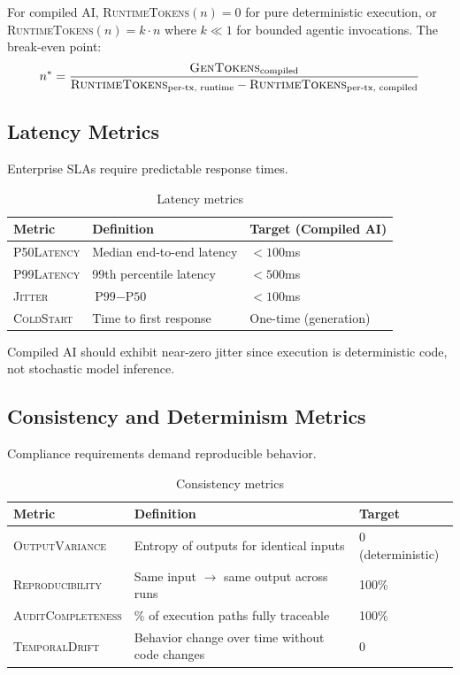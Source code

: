 \documentclass[11pt]{article}
\newcommand{\metric}[1]{\textsc{#1}}
\begin{document}
For compiled AI, \metric{RuntimeTokens}$(n) = 0$ for pure deterministic execution, or \metric{RuntimeTokens}$(n) = k \cdot n$ where $k \ll 1$ for bounded agentic invocations. The break-even point:
\begin{equation}
n^* = \frac{\text{\metric{GenTokens}}_{\text{compiled}}}{\text{\metric{RuntimeTokens}}_{\text{per-tx, runtime}} - \text{\metric{RuntimeTokens}}_{\text{per-tx, compiled}}}
\end{equation}

\subsection{Latency Metrics}

Enterprise SLAs require predictable response times.

\begin{table}[ht]
\centering
\caption{Latency metrics}
\label{tab:latency-metrics}
\begin{tabular}{p{3cm}p{5cm}p{4cm}}
\toprule
Metric & Definition & Target (Compiled AI) \\
\midrule
\metric{P50Latency} & Median end-to-end latency & $< 100$ms \\
\metric{P99Latency} & 99th percentile latency & $< 500$ms \\
\metric{Jitter} & $\text{P99} - \text{P50}$ & $< 100$ms \\
\metric{ColdStart} & Time to first response & One-time (generation) \\
\bottomrule
\end{tabular}
\end{table}

Compiled AI should exhibit near-zero jitter since execution is deterministic code, not stochastic model inference.

\subsection{Consistency and Determinism Metrics}

Compliance requirements demand reproducible behavior.

\begin{table}[ht]
\centering
\caption{Consistency metrics}
\label{tab:consistency-metrics}
\begin{tabular}{p{3.5cm}p{5cm}p{3.5cm}}
\toprule
Metric & Definition & Target \\
\midrule
\metric{OutputVariance} & Entropy of outputs for identical inputs & 0 (deterministic) \\
\metric{Reproducibility} & Same input $\rightarrow$ same output across runs & 100\% \\
\metric{AuditCompleteness} & \% of execution paths fully traceable & 100\% \\
\metric{TemporalDrift} & Behavior change over time without code changes & 0 \\
\bottomrule
\end{tabular}
\end{table}
\end{document}
